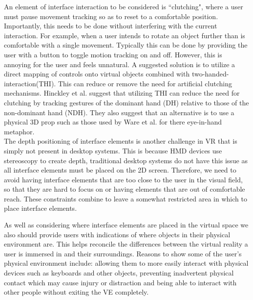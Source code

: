 \documentclass{sig-alternate-05-2015}
\begin{document}
 An element of interface interaction to be considered is ``clutching", where a user must pause movement tracking so as to reset to a comfortable position\cite{Hand1997}. Importantly, this needs to be done without interfering with the current interaction. For example, when a user intends to rotate an object further than is comfortable with a single movement. Typically this can be done by providing the user with a button to toggle motion tracking on and off. However, this is annoying for the user and feels unnatural\cite{Hand1997}.  A suggested solution is to utilize a direct mapping of controls onto virtual objects combined with two-handed-interaction(THI). This can reduce or remove the need for artificial clutching mechanisms\cite{Hand1997}.  Hinckley et al. suggest that utilizing THI can reduce the need for clutching by tracking gestures of the dominant hand (DH) relative to those of the non-dominant hand (NDH)\cite{Hinckley1994}. They also suggest that an alternative is to use a physical 3D prop such as those used by Ware et al. for there eye-in-hand metaphor\cite{Ware1990}.\\
 
 The depth positioning of interface elements is another challenge in VR that is simply not present in desktop systems.\cite{Alger2015} This is because HMD devices use stereoscopy to create depth, traditional desktop systems do not have this issue as all interface elements must be placed on the 2D screen. Therefore, we need to avoid having interface elements that are too close to the user in the visual field, so that they are hard to focus on or having elements that are out of comfortable reach. These constraints combine to leave a somewhat restricted area in which to place interface elements.
 
As well as considering where interface elements are placed in the virtual space we also should provide users with indications of where objects in their physical environment are. This helps reconcile the differences between the virtual reality a user is immersed in and their surroundings\cite{Duval2014}. Reasons to show some of the user's physical environment include: allowing them to more easily interact with physical devices such as keyboards and other objects, preventing inadvertent physical contact which may cause injury or distraction and being able to interact with other people without exiting the VE completely.
 
\end{document}

